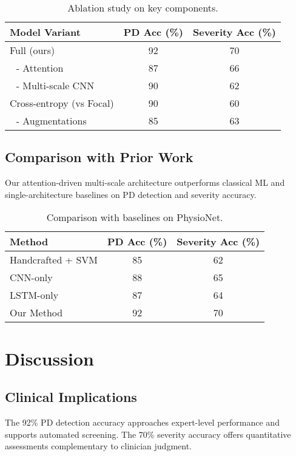 \documentclass[conference]{IEEEtran}
\begin{document}
\begin{table}[t]
\centering
\caption{Ablation study on key components.}
\label{tab:ablation}
\begin{tabular}{lcc}
\toprule
Model Variant & PD Acc (\%) & Severity Acc (\%) \\
\midrule
Full (ours)              & 92 & 70 \\
\,\, - Attention         & 87 & 66 \\
\,\, - Multi-scale CNN    & 90 & 62 \\
Cross-entropy (vs Focal) & 90 & 60 \\
\,\, - Augmentations      & 85 & 63 \\
\bottomrule
\end{tabular}
\end{table}

\subsection{Comparison with Prior Work}
Our attention-driven multi-scale architecture outperforms classical ML and single-architecture baselines on PD detection and severity accuracy.

\begin{table}[t]
\centering
\caption{Comparison with baselines on PhysioNet.}
\label{tab:comparison}
\begin{tabular}{lcc}
\toprule
Method & PD Acc (\%) & Severity Acc (\%) \\
\midrule
Handcrafted + SVM & 85 & 62 \\
CNN-only          & 88 & 65 \\
LSTM-only         & 87 & 64 \\
Our Method        & 92 & 70 \\
\bottomrule
\end{tabular}
\end{table}

\section{Discussion}
\subsection{Clinical Implications}
The 92\% PD detection accuracy approaches expert-level performance and supports automated screening. The 70\% severity accuracy offers quantitative assessments complementary to clinician judgment.
\end{document}
